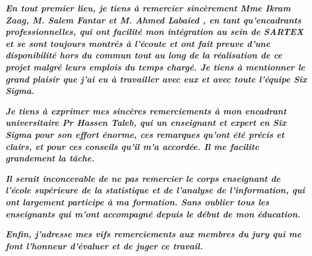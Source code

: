 \documentclass[12pt, a4paper]{thesis}
\begin{document}
\textbf{\textit{
En tout premier lieu, je tiens à remercier sincèrement Mme Ikram Zaag, M. Salem Fantar et M. Ahmed Labaied , en tant qu'encadrants professionnelles, qui ont facilité mon intégration au sein de SARTEX et se sont toujours montrés à l'écoute et ont fait preuve d'une disponibilité hors du commun tout au long de la réalisation de ce projet malgré leurs emplois du temps chargé. Je tiens à mentionner le grand plaisir que j'ai eu à travailler avec eux et avec toute l’équipe Six Sigma.\\} }

\textbf{\textit{
Je tiens à exprimer mes sincères remerciements à mon encadrant universitaire Pr Hassen Taleb, qui un enseignant et expert en Six Sigma pour son effort énorme, ces remarques qu’ont été précis et clairs, et pour ces conseils qu’il m’a accordée. Il me facilite grandement la tâche.\\} }

\textbf{\textit{
Il serait inconcevable de ne pas remercier le corps enseignant de l'école supérieure de la statistique et de l'analyse de l'information, qui ont largement participe à ma formation. Sans oublier tous les enseignants qui m'ont accompagné depuis le début de mon éducation.\\}}

\textbf{\textit{
Enfin, j'adresse mes vifs remerciements aux membres du jury qui me font l'honneur d'évaluer et de juger ce travail.\\}}


\tableofcontents
\listoffigures
{}
\listoftables
{}
\end{document}
